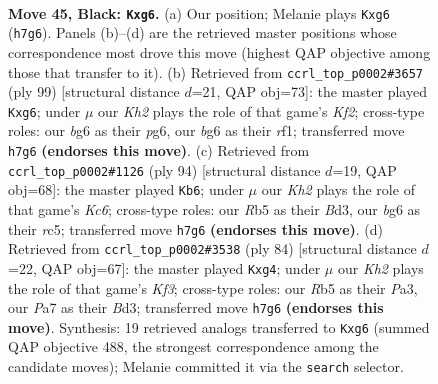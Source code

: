 \documentclass[11pt]{article}
\begin{document}
\clearpage

\begin{figure}[p]\centering
\begin{subfigure}{0.46\textwidth}\centering
\resizebox{\linewidth}{!}{%
\newchessgame
\chessboard[
  setfen={8/p6k/Pp4B1/1r6/5B2/6K1/8/8 b - - 0 45},
  showmover=false,
  pgfstyle=straightmove, color=movearrow, markmove={h7-g6}
]}
\caption{}
\end{subfigure}\hfill
\begin{subfigure}{0.46\textwidth}\centering
\resizebox{\linewidth}{!}{%
\newchessgame
\chessboard[
  setfen={8/5k2/p5P1/1p6/1r6/3pB1K1/8/5R2 b - - 0 50},
  showmover=false,
  pgfstyle=straightmove, color=movearrow, markmove={f7-g6}
]}
\caption{}
\end{subfigure}
\\[4pt]
\begin{subfigure}{0.46\textwidth}\centering
\resizebox{\linewidth}{!}{%
\newchessgame
\chessboard[
  setfen={R7/4b3/2K1k3/2r5/1p6/1P1B4/P7/8 w - - 9 48},
  showmover=false,
  pgfstyle=straightmove, color=movearrow, markmove={c6-b6}
]}
\caption{}
\end{subfigure}\hfill
\begin{subfigure}{0.46\textwidth}\centering
\resizebox{\linewidth}{!}{%
\newchessgame
\chessboard[
  setfen={8/4b3/5k2/P6P/6p1/P2B1K2/8/8 w - - 0 43},
  showmover=false,
  pgfstyle=straightmove, color=movearrow, markmove={f3-g4}
]}
\caption{}
\end{subfigure}
\caption{\textbf{Move 45, Black: \texttt{Kxg6}.} (a) Our position; Melanie plays \texttt{Kxg6} (\texttt{h7g6}). Panels (b)--(d) are the retrieved master positions whose correspondence most drove this move (highest QAP objective among those that transfer to it). (b) Retrieved from \texttt{ccrl\_top\_p0002\#3657} (ply 99) [structural distance $d$=21, QAP obj=73]: the master played \texttt{Kxg6}; under $\mu$ our \emph{Kh2} plays the role of that game's \emph{Kf2}; cross-type roles: our \emph{b}g6 as their \emph{p}g6, our \emph{b}g6 as their \emph{r}f1; transferred move \texttt{h7g6} \textbf{(endorses this move)}. (c) Retrieved from \texttt{ccrl\_top\_p0002\#1126} (ply 94) [structural distance $d$=19, QAP obj=68]: the master played \texttt{Kb6}; under $\mu$ our \emph{Kh2} plays the role of that game's \emph{Kc6}; cross-type roles: our \emph{R}b5 as their \emph{B}d3, our \emph{b}g6 as their \emph{r}c5; transferred move \texttt{h7g6} \textbf{(endorses this move)}. (d) Retrieved from \texttt{ccrl\_top\_p0002\#3538} (ply 84) [structural distance $d$=22, QAP obj=67]: the master played \texttt{Kxg4}; under $\mu$ our \emph{Kh2} plays the role of that game's \emph{Kf3}; cross-type roles: our \emph{R}b5 as their \emph{P}a3, our \emph{P}a7 as their \emph{B}d3; transferred move \texttt{h7g6} \textbf{(endorses this move)}. Synthesis: 19 retrieved analogs transferred to \texttt{Kxg6} (summed QAP objective 488, the strongest correspondence among the candidate moves); Melanie committed it via the \texttt{search} selector.}
\label{fig:thought-m89}
\end{figure}
\end{document}

